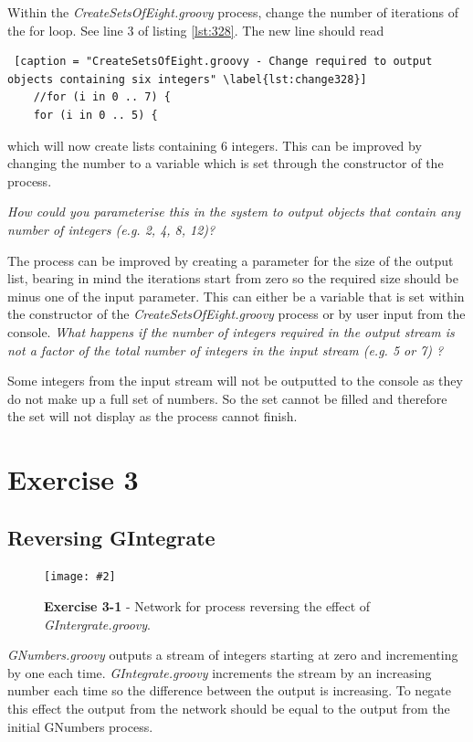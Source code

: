 \documentclass[10pt, a4paper]{article}
\newcommand{\figuremacro}[5]{
    \begin{figure}[#1]
        \centering
        \texttt{[image: \#2]}
        \caption[#3]{\textbf{#3}#4}
        \label{fig:#2}
    \end{figure}
}
\begin{document}
    Within the \textit{CreateSetsOfEight.groovy} process, change the number of iterations of the for loop. See line 3 of listing \ref{lst:328}. The new line should read 
    
    \begin{lstlisting} [caption = "CreateSetsOfEight.groovy - Change required to output objects containing six integers" \label{lst:change328}]
    //for (i in 0 .. 7) {
    for (i in 0 .. 5) {    \end{lstlisting}
    
    which will now create lists containing 6 integers. This can be improved by changing the number to a variable which is set through the constructor of the process.
    
	\subitem 
	 \textit{How could you parameterise this in the system to output objects that contain any number of integers (e.g. 2, 4, 8, 12)?}
	 
	 The process can be improved by creating a parameter for the size of the output list, bearing in mind the iterations start from zero so the required size should be minus one of the input parameter. This can either be a variable that is set within the constructor of the \textit{CreateSetsOfEight.groovy} process or by user input from the console. 
	\subitem 
	\textit{What happens if the number of integers required in the output stream is not a factor of the total number of integers in the input stream (e.g. 5 or 7) ?}
	
	Some integers from the input stream will not be outputted to the console as they do not make up a full set of numbers. So the set cannot be filled and therefore the set will not display as the process cannot finish.
	
	\setcounter{section}{3}
	\section*{Exercise 3}
	
	\setcounter{subsection}{0}
	\subsection{Reversing GIntegrate}
	
	\figuremacro{H}{3-1network}{Exercise 3-1}{ - Network for process reversing the effect of \textit{GIntergrate.groovy}.}{1.0}
	
	\textit{GNumbers.groovy} outputs a stream of integers starting at zero and incrementing by one each time. \textit{GIntegrate.groovy} increments the stream by an increasing number each time so the difference between the output is increasing. To negate this effect the output from the network should be equal to the output from the initial GNumbers process.
	
\end{document}
